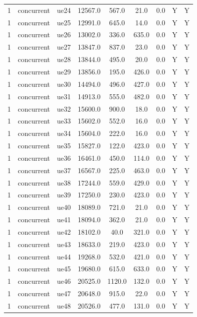 \begin{table}[ht]
\begin{tabular}{|c|c|c|c|c|c|c|c|c|}
1 & concurrent & ue24 & 12567.0 & 567.0 & 21.0 & 0.0 & Y & Y \\
1 & concurrent & ue25 & 12991.0 & 645.0 & 14.0 & 0.0 & Y & Y \\
1 & concurrent & ue26 & 13002.0 & 336.0 & 635.0 & 0.0 & Y & Y \\
1 & concurrent & ue27 & 13847.0 & 837.0 & 23.0 & 0.0 & Y & Y \\
1 & concurrent & ue28 & 13844.0 & 495.0 & 20.0 & 0.0 & Y & Y \\
1 & concurrent & ue29 & 13856.0 & 195.0 & 426.0 & 0.0 & Y & Y \\
1 & concurrent & ue30 & 14494.0 & 496.0 & 427.0 & 0.0 & Y & Y \\
1 & concurrent & ue31 & 14913.0 & 555.0 & 482.0 & 0.0 & Y & Y \\
1 & concurrent & ue32 & 15600.0 & 900.0 & 18.0 & 0.0 & Y & Y \\
1 & concurrent & ue33 & 15602.0 & 552.0 & 16.0 & 0.0 & Y & Y \\
1 & concurrent & ue34 & 15604.0 & 222.0 & 16.0 & 0.0 & Y & Y \\
1 & concurrent & ue35 & 15827.0 & 122.0 & 423.0 & 0.0 & Y & Y \\
1 & concurrent & ue36 & 16461.0 & 450.0 & 114.0 & 0.0 & Y & Y \\
1 & concurrent & ue37 & 16567.0 & 225.0 & 463.0 & 0.0 & Y & Y \\
1 & concurrent & ue38 & 17244.0 & 559.0 & 429.0 & 0.0 & Y & Y \\
1 & concurrent & ue39 & 17250.0 & 230.0 & 423.0 & 0.0 & Y & Y \\
1 & concurrent & ue40 & 18089.0 & 721.0 & 21.0 & 0.0 & Y & Y \\
1 & concurrent & ue41 & 18094.0 & 362.0 & 21.0 & 0.0 & Y & Y \\
1 & concurrent & ue42 & 18102.0 & 40.0 & 321.0 & 0.0 & Y & Y \\
1 & concurrent & ue43 & 18633.0 & 219.0 & 423.0 & 0.0 & Y & Y \\
1 & concurrent & ue44 & 19268.0 & 532.0 & 421.0 & 0.0 & Y & Y \\
1 & concurrent & ue45 & 19680.0 & 615.0 & 633.0 & 0.0 & Y & Y \\
1 & concurrent & ue46 & 20525.0 & 1120.0 & 132.0 & 0.0 & Y & Y \\
1 & concurrent & ue47 & 20648.0 & 915.0 & 22.0 & 0.0 & Y & Y \\
1 & concurrent & ue48 & 20526.0 & 477.0 & 131.0 & 0.0 & Y & Y \\

\end{tabular}
\end{table}

